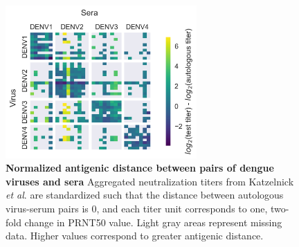 \begin{figure}[ht!]
\begin{centering}
\includegraphics[width=0.65\textwidth]{./png/titer_heatmap.png}
    \caption[Normalized antigenic distance between pairs of dengue viruses and sera]{\textbf{Normalized antigenic distance between pairs of dengue viruses and sera }
    Aggregated neutralization titers from Katzelnick \textit{et al}. are standardized such that the distance between autologous virus-serum pairs is 0, and each titer unit corresponds to one, two-fold change in PRNT50 value.
    Light gray areas represent missing data.
    Higher values correspond to greater antigenic distance.
    }
     \label{titer_heatmap}
\end{centering}
\end{figure}

